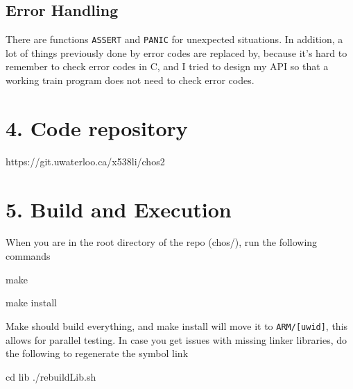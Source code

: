 \documentclass{article}
\begin{document}
\subsection*{Error Handling}

There are functions \texttt{ASSERT} and \texttt{PANIC} for unexpected situations. In addition, a lot of things previously done by error codes are replaced by, because it's hard to remember to check error codes in C, and I tried to design my API so that a working train program does not need to check error codes.


\section*{4. Code repository}

https://git.uwaterloo.ca/x538li/chos2

\section*{5. Build and Execution}

When you are in the root directory of the repo (chos/), run the following commands

make

make install

Make should build everything, and make install will move it to \texttt{ARM/[uwid]}, this allows for parallel testing.
In case you get issues with missing linker libraries, do the following to regenerate the symbol link

cd lib
./rebuildLib.sh
\end{document}
